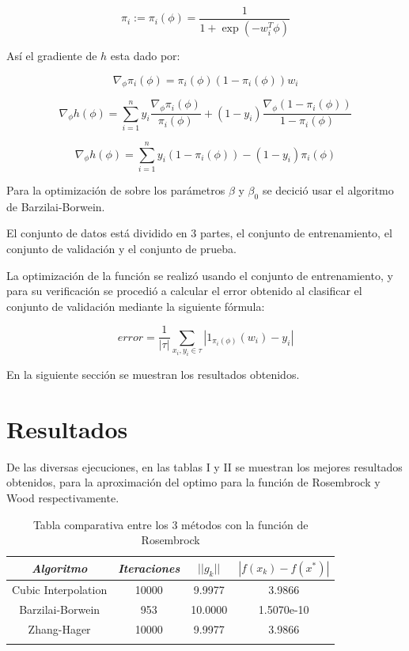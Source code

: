\documentclass[conference]{IEEEtran}
\begin{document}
\begin{equation}
	\pi_i:= \pi_i(\phi) = \frac{1}{1 + \exp(-w_i^T\phi)}
\end{equation}

Así el gradiente de $h$ esta dado por:

\begin{equation}
	\nabla_\phi \pi_i(\phi) = \pi_i(\phi)(1 - \pi_i(\phi)) w_i
\end{equation}


\begin{equation*}
	\nabla_\phi h(\phi) = \sum_{i=1}^{n} y_i \frac{\nabla_\phi \pi_i(\phi)}{\pi_i(\phi)} + (1-y_i) \frac{\nabla_\phi (1- \pi_i(\phi))}{1 - \pi_i(\phi)}
\end{equation*}

\begin{equation}
	\nabla_\phi h(\phi) = \sum_{i=1}^{n} y_i (1 - \pi_i(\phi)) - (1-y_i) \pi_i(\phi)
\end{equation}

Para la optimización de sobre los parámetros $\beta$ y $\beta_0$ se decició usar el algoritmo de
Barzilai-Borwein.

El conjunto de datos está dividido en 3 partes, el conjunto de entrenamiento, el conjunto de
validación y el conjunto de prueba.

La optimización de la función se realizó usando el conjunto de entrenamiento, y para su verificación
se procedió a calcular el error obtenido al clasificar el conjunto de validación mediante la
siguiente fórmula:

$$
error = \frac{1}{|\tau|} \sum_{x_i,y_i \in \tau} |1_{\pi_{i}(\phi)}(w_i) - y_i|
$$


En la siguiente sección se muestran los resultados obtenidos.

\section{Resultados}

De las diversas ejecuciones, en las tablas I y II se muestran los mejores resultados obtenidos,
para la aproximación del optimo para la función de Rosembrock y Wood respectivamente.

\begin{table}[htbp]
    \caption{Tabla comparativa entre los 3 métodos con la función de Rosembrock}
    \begin{center}
        \begin{tabular}{|c|c|c|c|}
            \hline
			\textbf{\textit{Algoritmo}}& \textbf{\textit{Iteraciones}}& \textbf{\textit{$||g_k||$}}& \textbf{\textit{$|f(x_k) - f(x^*)|$}} \\

            \hline
            Cubic Interpolation& 10000 & 9.9977 & 3.9866 \\
            Barzilai-Borwein& 953 & 10.0000 & 1.5070e-10 \\
            Zhang-Hager& 10000 & 9.9977 & 3.9866 \\
            \hline
            \multicolumn{4}{l}{}
        \end{tabular}
        \label{tab1}
    \end{center}
\end{table}
\end{document}
